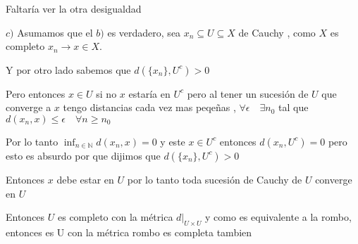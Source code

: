 \documentclass[12pt]{article}
\newcommand{\N}{\mathbb{N}}
\newcommand{\ra}{\rightarrow}
\theoremstyle{definition}
\begin{document}
Faltaría ver la otra desigualdad

$c)$ Asumamos que el $b)$ es verdadero, sea $x_n \subseteq U \subseteq X$ de Cauchy , como $X$ es completo $x_n \ra x \in X$.

Y por otro lado sabemos que $d(\{x_n\} , U^c) > 0$ 


Pero entonces $x \in U$ si no $x$ estaría en $U^c$ pero al tener un sucesión de $U$ que converge a $x$ tengo distancias cada vez mas peqeñas , $\forall \epsilon \quad \exists n_0$ tal que $d(x_n,x) \leq \epsilon \quad \forall n \geq n_0$

Por lo tanto $\inf_{n \in \N} d(x_n,x) = 0$ y este $x \in U^c$ entonces $d(x_n,U^c) = 0$ pero esto es absurdo por que dijimos que $d(\{x_n\}, U^c) > 0$

Entonces $x$ debe estar en $U$ por lo tanto toda sucesión de Cauchy de $U$ converge en $U$

Entonces $U$ es completo con la métrica $d|_{U \times U}$ y como es equivalente a la rombo, entonces es U con la métrica rombo es completa tambien
\end{document}

